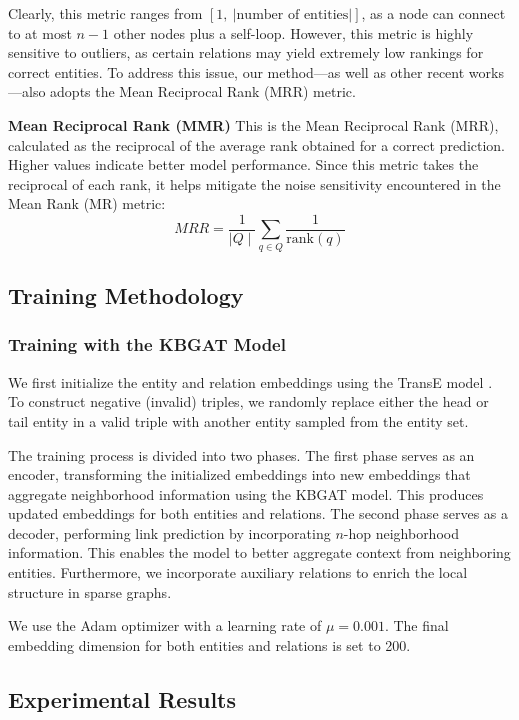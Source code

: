 Clearly, this metric ranges from \([1,~|\text{number of entities}|]\), as a node can connect to at most \(n-1\) other nodes plus a self-loop. However, this metric is highly sensitive to outliers, as certain relations may yield extremely low rankings for correct entities. To address this issue, our method—as well as other recent works—also adopts the Mean Reciprocal Rank (MRR) metric.


\textbf{Mean Reciprocal Rank (MMR)}
This is the Mean Reciprocal Rank (MRR), calculated as the reciprocal of the average rank obtained for a correct prediction. Higher values indicate better model performance. Since this metric takes the reciprocal of each rank, it helps mitigate the noise sensitivity encountered in the Mean Rank (MR) metric:
\[
MRR =\frac{1}{\mid Q \mid} \sum_{q \in Q} \frac{1}{\text{rank}(q)}
\]

\subsection{Training Methodology}

\subsubsection{Training with the KBGAT Model}

We first initialize the entity and relation embeddings using the TransE model \cite{bordes2013translating}. To construct negative (invalid) triples, we randomly replace either the head or tail entity in a valid triple with another entity sampled from the entity set.

The training process is divided into two phases. The first phase serves as an encoder, transforming the initialized embeddings into new embeddings that aggregate neighborhood information using the KBGAT model. This produces updated embeddings for both entities and relations. The second phase serves as a decoder, performing link prediction by incorporating $n$-hop neighborhood information. This enables the model to better aggregate context from neighboring entities. Furthermore, we incorporate auxiliary relations to enrich the local structure in sparse graphs.

We use the Adam optimizer with a learning rate of $\mu = 0.001$. The final embedding dimension for both entities and relations is set to 200. 


\subsection{Experimental Results}
\label{sec:Experiment}

